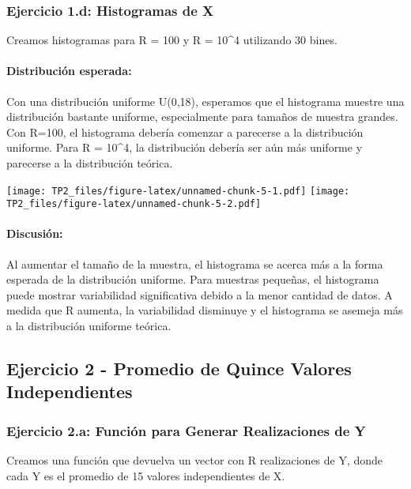 \documentclass[
]{article}
\begin{document}
\subsubsection{Ejercicio 1.d: Histogramas de
X}\label{ejercicio-1.d-histogramas-de-x}

Creamos histogramas para R = 100 y R = 10\^{}4 utilizando 30 bines.

\paragraph{Distribución esperada:}\label{distribuciuxf3n-esperada}

Con una distribución uniforme U(0,18), esperamos que el histograma
muestre una distribución bastante uniforme, especialmente para tamaños
de muestra grandes. Con R=100, el histograma debería comenzar a
parecerse a la distribución uniforme. Para R = 10\^{}4, la distribución
debería ser aún más uniforme y parecerse a la distribución teórica.

\texttt{[image: TP2\_files/figure-latex/unnamed-chunk-5-1.pdf]}
\texttt{[image: TP2\_files/figure-latex/unnamed-chunk-5-2.pdf]}

\paragraph{Discusión:}\label{discusiuxf3n}

Al aumentar el tamaño de la muestra, el histograma se acerca más a la
forma esperada de la distribución uniforme. Para muestras pequeñas, el
histograma puede mostrar variabilidad significativa debido a la menor
cantidad de datos. A medida que R aumenta, la variabilidad disminuye y
el histograma se asemeja más a la distribución uniforme teórica.

\subsection{Ejercicio 2 - Promedio de Quince Valores
Independientes}\label{ejercicio-2---promedio-de-quince-valores-independientes}

\subsubsection{Ejercicio 2.a: Función para Generar Realizaciones de
Y}\label{ejercicio-2.a-funciuxf3n-para-generar-realizaciones-de-y}

Creamos una función que devuelva un vector con R realizaciones de Y,
donde cada Y es el promedio de 15 valores independientes de X.
\end{document}
